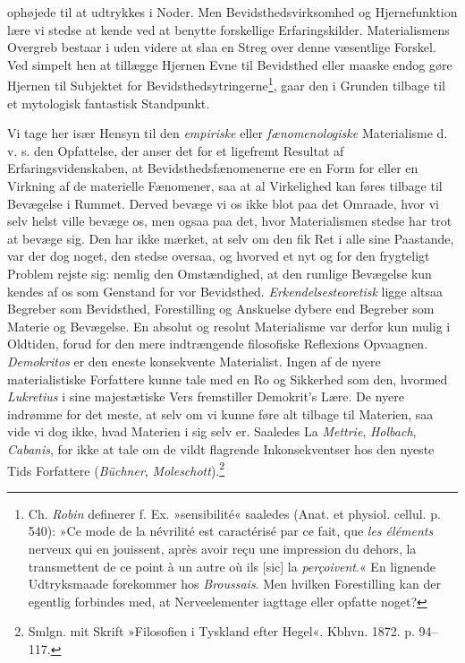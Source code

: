 \documentclass[12pt,a4paper,openany]{book}
\newcommand{\opage}[1]{\marginnote{\footnotesize\textit{[#1]}}}
\begin{document}
ophøjede til at udtrykkes i Noder. Men Bevidsthedsvirksomhed og
Hjernefunktion lære vi stedse at
\opage{73}kende ved at benytte forskellige Erfaringskilder.
Materialismens Overgreb bestaar i uden videre at slaa en Streg over
denne væsentlige Forskel. Ved simpelt hen at tillægge Hjernen Evne til
Bevidsthed eller maaske endog gøre Hjernen til Subjektet for
Bevidsthedsytringerne\footnote[1]{Ch. \emph{Robin} definerer f. Ex.
»sensibilité« saaledes (Anat. et physiol. cellul. p. 540): »Ce mode de
la névrilité est caractérisé par ce fait, que \emph{les éléments}
nerveux qui en jouissent, après avoir reçu une impression du dehors, la
transmettent de ce point à un autre où ils [sic] la \emph{perçoivent}.«
En lignende Udtryksmaade forekommer hos \emph{Broussais}. Men hvilken
Forestilling kan der egentlig forbindes med, at Nerveelementer iagttage
eller opfatte noget?}, gaar den i Grunden tilbage til et mytologisk
fantastisk Standpunkt.

Vi tage her især Hensyn til den \emph{empiriske} eller
\emph{fænomenologiske} Materialisme d. v. s. den Opfattelse, der anser
det for et ligefremt Resultat af Erfaringsvidenskaben, at
Bevidsthedsfænomenerne ere en Form for eller en Virkning af de
materielle Fænomener, saa at al Virkelighed kan føres tilbage til
Bevægelse i Rummet. Derved bevæge vi os ikke blot paa det Omraade, hvor
vi selv helst ville bevæge os, men ogsaa paa det, hvor Materialismen
stedse har trot at bevæge sig. Den har ikke mærket, at selv om den fik
Ret i alle sine Paastande, var der dog noget, den stedse oversaa, og
hvorved et nyt og for den frygteligt Problem rejste sig: nemlig den
Omstændighed, at den rumlige Bevægelse kun kendes af os som Genstand for
vor Bevidsthed. \emph{Erkendelsesteoretisk} ligge altsaa Begreber som
Bevidsthed, Forestilling og Anskuelse dybere end Begreber som Materie og
Bevægelse. En absolut og resolut Materialisme var derfor kun mulig i
Oldtiden, forud for den mere indtrængende filosofiske Reflexions
Opvaagnen. \emph{Demokritos} er den eneste konsekvente Materialist.
Ingen af de nyere materialistiske Forfattere kunne tale med en Ro og
Sikkerhed som den, hvormed \emph{Lukretius} i sine majestætiske Vers
fremstiller Demokrit’s Lære. De nyere indrømme for det meste, at selv om
vi kunne føre alt tilbage til Materien, saa vide vi dog ikke, hvad
Materien i sig selv er. Saaledes La \emph{Mettrie}, \emph{Holbach},
\emph{Cabanis}, for ikke at tale om de
\opage{74}vildt flagrende Inkonsekventser hos den nyeste Tids Forfattere
(\emph{Büchner}, \emph{Moleschott}).\footnote[1]{Smlgn. mit Skrift
»Filosofien i Tyskland efter Hegel«. Kbhvn. 1872. p. 94--117.}
\end{document}
